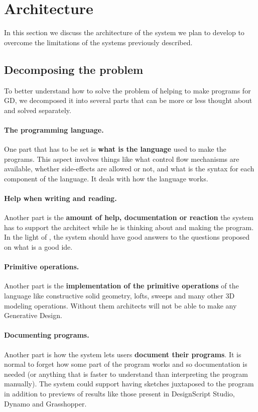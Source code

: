 \documentclass{./llncs2e/llncs}
\begin{document}
\section{Architecture}
	In this section we discuss the architecture of the system we plan to develop to overcome the limitations of the systems previously described.

\subsection{Decomposing the problem}
	To better understand how to solve the problem of helping to make programs for GD, we decomposed it into several parts that can be more or less thought about and solved separately.
	
	\paragraph{The programming language.}
	One part that has to be set is \textbf{what is the language} used to make the programs.
	This aspect involves things like what control flow mechanisms are available, whether side-effects are allowed or not, and what is the syntax for each component of the language.
	It deals with how the language works.

	\paragraph{Help when writing and reading.}
	Another part is the \textbf{amount of help, documentation or reaction} the system has to support the architect while he is thinking about and making the program.
	In the light of \cite{victor2012learnable}, the system should have good answers to the questions proposed on what is a good \ac{ide}.

	\paragraph{Primitive operations.}
	Another part is the \textbf{implementation of the primitive operations} of the language like constructive solid geometry, lofts, sweeps and many other 3D modeling operations.
	Without them architects will not be able to make any Generative Design.

	\paragraph{Documenting programs.}
	Another part is how the system lets users \textbf{document their programs}. 
	It is normal to forget how some part of the program works and so documentation is needed (or anything that is faster to understand than interpreting the program manually).
	The system could support having sketches juxtaposed to the program in addition to previews of results like those present in DesignScript Studio, Dynamo and Grasshopper. 
\end{document}
